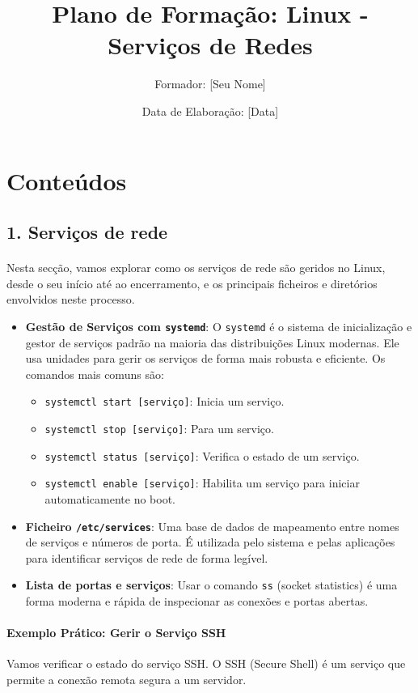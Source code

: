 \documentclass[10pt,a4paper]{article}
\title{Plano de Formação: Linux - Serviços de Redes}
\author{Formador: [Seu Nome]} %
\date{Data de Elaboração: [Data]} %
\begin{document}
	
	\section*{Conteúdos}
	
	\subsection*{1. Serviços de rede}
	\vspace{-1.2em}
	\paragraph{}
	Nesta secção, vamos explorar como os serviços de rede são geridos no Linux, desde o seu início até ao encerramento, e os principais ficheiros e diretórios envolvidos neste processo.
	
	\begin{itemize}
		\item \textbf{Gestão de Serviços com \texttt{systemd}}: O \texttt{systemd} é o sistema de inicialização e gestor de serviços padrão na maioria das distribuições Linux modernas. Ele usa unidades para gerir os serviços de forma mais robusta e eficiente. Os comandos mais comuns são:
		\begin{itemize}
			\item \texttt{systemctl start [serviço]}: Inicia um serviço.
			\item \texttt{systemctl stop [serviço]}: Para um serviço.
			\item \texttt{systemctl status [serviço]}: Verifica o estado de um serviço.
			\item \texttt{systemctl enable [serviço]}: Habilita um serviço para iniciar automaticamente no boot.
		\end{itemize}
		
		\item \textbf{Ficheiro \texttt{/etc/services}}: Uma base de dados de mapeamento entre nomes de serviços e números de porta. É utilizada pelo sistema e pelas aplicações para identificar serviços de rede de forma legível.
		\item \textbf{Lista de portas e serviços}: Usar o comando \texttt{ss} (socket statistics) é uma forma moderna e rápida de inspecionar as conexões e portas abertas.
	\end{itemize}
	
	\paragraph{\bfseries Exemplo Prático: Gerir o Serviço SSH}
	Vamos verificar o estado do serviço SSH. O SSH (Secure Shell) é um serviço que permite a conexão remota segura a um servidor.
	
\end{document}

